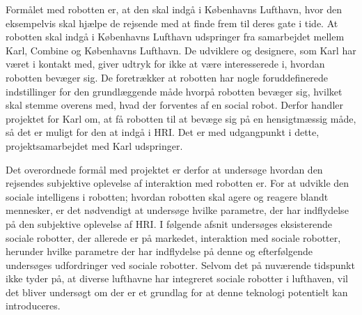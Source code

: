 \noindent
%
Formålet med robotten er, at den skal indgå i Københavns Lufthavn, hvor den eksempelvis skal hjælpe de rejsende med at finde frem til deres gate i tide. At robotten skal indgå i Københavns Lufthavn udspringer fra samarbejdet mellem Karl, Combine og Københavns Lufthavn. De udviklere og designere, som Karl har været i kontakt med, giver udtryk for ikke at være interesserede i, hvordan robotten bevæger sig. De foretrækker at robotten har nogle foruddefinerede indstillinger for den grundlæggende måde hvorpå robotten bevæger sig, hvilket skal stemme overens med, hvad der forventes af en social robot. Derfor handler projektet for Karl om, at få robotten til at bevæge sig på en hensigtmæssig måde, så det er muligt for den at indgå i HRI. Det er med udgangpunkt i dette, projektsamarbejdet med Karl udspringer. 

Det overordnede formål med projektet er derfor at undersøge hvordan den rejsendes subjektive oplevelse af interaktion med robotten er.\blankline
%  
For at udvikle den sociale intelligens i robotten; hvordan robotten skal agere og reagere blandt mennesker, er det nødvendigt at undersøge hvilke parametre, der har indflydelse på den subjektive oplevelse af HRI. I følgende afsnit undersøges eksisterende sociale robotter, der allerede er på markedet, interaktion med sociale robotter, herunder hvilke parametre der har indflydelse på denne og efterfølgende undersøges udfordringer ved sociale robotter. Selvom det på nuværende tidspunkt ikke tyder på, at diverse lufthavne har integreret sociale robotter i lufthaven, vil det bliver undersøgt om der er et grundlag for at denne teknologi potentielt kan introduceres. 

